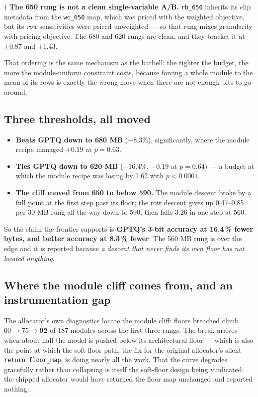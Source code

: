 \documentclass[11pt]{article}
\newcommand{\pct}{\,\%}
\newcommand{\code}[1]{\texttt{#1}}
\begin{document}
$\dagger$ \textbf{The 650 rung is not a clean single-variable A/B.} \code{rb\_650} inherits its
clip metadata from the \code{wc\_650} map, which was priced with the weighted objective, but its
\emph{row} sensitivities were priced unweighted --- so that rung mixes granularity with pricing
objective. The 680 and 620 rungs are clean, and they bracket it at $+0.87$ and $+1.43$.

That ordering is the same mechanism as the barbell: the tighter the budget, the more the
module-uniform constraint costs, because forcing a whole module to the mean of its rows is exactly
the wrong move when there are not enough bits to go around.

\subsection{Three thresholds, all moved}

\begin{itemize}[leftmargin=1.4em]
\item \textbf{Beats GPTQ down to 680 MB} ($-8.3\%$), significantly, where the module recipe managed
$+0.19$ at $p = 0.63$.
\item \textbf{Ties GPTQ down to 620 MB} ($-16.4\%$, $-0.19$ at $p = 0.64$) --- a budget at which the
module recipe was losing by 1.62 with $p < 0.0001$.
\item \textbf{The cliff moved from 650 to below 590.} The module descent broke by a full point at
the first step past its floor; the row descent gives up 0.47--0.85 per 30 MB rung all the way down
to 590, then falls 3.26 in one step at 560.
\end{itemize}

So the claim the frontier supports is \textbf{GPTQ's 3-bit accuracy at 16.4\pct{} fewer bytes, and
better accuracy at 8.3\pct{} fewer}. The 560 MB rung is over the edge and it is reported because
\emph{a descent that never finds its own floor has not located anything}.

\subsection{Where the module cliff comes from, and an instrumentation gap}

The allocator's own diagnostics locate the module cliff: floors breached climb $60 \to 75 \to
\mathbf{92}$ of 187 modules across the first three rungs. The break arrives when about half the
model is pushed below its architectural floor --- which is also the point at which the soft-floor
path, the fix for the original allocator's silent \code{return floor\_map}, is doing nearly all the
work. That the curve degrades gracefully rather than collapsing is itself the soft-floor design
being vindicated: the shipped allocator would have returned the floor map unchanged and reported
nothing.
\end{document}
